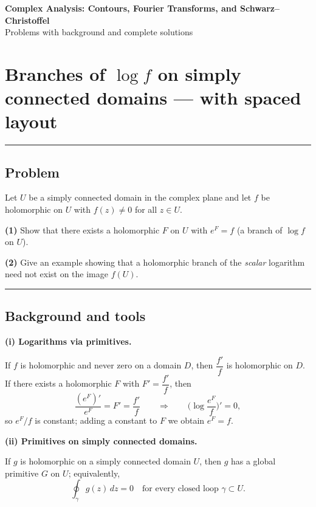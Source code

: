 \documentclass[11pt]{article}
\begin{document}
	
	\begin{center}
		{\Large\bf Complex Analysis: Contours, Fourier Transforms, and Schwarz--Christoffel}\\[0.45em]
		{\small Problems with background and complete solutions}
	\end{center}
	
	\bigskip
	
	
\section*{Branches of $\log f$ on simply connected domains — with spaced layout}

\bigskip\hrule\bigskip

\subsection*{Problem}

Let $U$ be a simply connected domain in the complex plane and let $f$ be holomorphic on $U$ with $f(z)\neq 0$ for all $z\in U$.

\medskip

\noindent\textbf{(1)} Show that there exists a holomorphic $F$ on $U$ with $e^{F}=f$ (a branch of $\log f$ on $U$).

\noindent\textbf{(2)} Give an example showing that a holomorphic branch of the \emph{scalar} logarithm need not exist on the image $f(U)$.

\bigskip\hrule\bigskip

\subsection*{Background and tools}

\medskip

\noindent\textbf{(i) Logarithms via primitives.}

If $f$ is holomorphic and never zero on a domain $D$, then $\dfrac{f'}{f}$ is holomorphic on $D$. If there exists a holomorphic $F$ with $F' = \dfrac{f'}{f}$, then
\[
\frac{(e^{F})'}{e^{F}} = F' = \frac{f'}{f}
\qquad\Longrightarrow\qquad
\Big(\log \frac{e^{F}}{f}\Big)' = 0,
\]
so $e^{F}/f$ is constant; adding a constant to $F$ we obtain $e^{F}=f$.

\medskip

\noindent\textbf{(ii) Primitives on simply connected domains.}

If $g$ is holomorphic on a simply connected domain $U$, then $g$ has a global primitive $G$ on $U$; equivalently,
\[
\oint_{\gamma} g(z)\,dz=0 \quad \text{for every closed loop }\gamma\subset U.
\]
\end{document}
